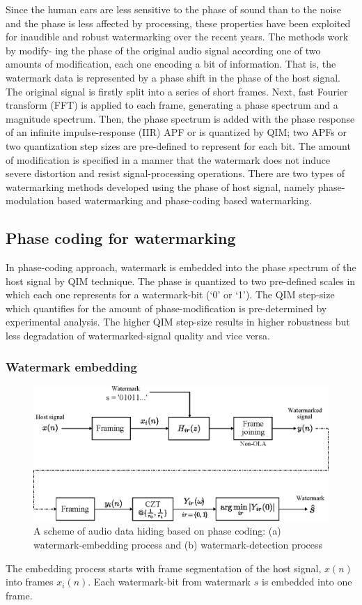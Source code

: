 Since the human ears are less sensitive to the phase of sound than to the noise and the
phase is less affected by processing, these properties have been exploited for inaudible and
robust watermarking over the recent years\cite{dong}. The methods work by modify-
ing the phase of the original audio signal according one of two amounts of modification,
each one encoding a bit of information. That is, the watermark data is represented by a
phase shift in the phase of the host signal.
The original signal is firstly split into a series of short frames. Next, fast Fourier
transform (FFT) is applied to each frame, generating a phase spectrum and a magnitude
spectrum. Then, the phase spectrum is added with the phase response of an infinite
impulse-response (IIR) APF or is quantized by QIM; two APFs or two quantization step
sizes are pre-defined to represent for each bit. The amount of modification is specified in a
manner that the watermark does not induce severe distortion and resist signal-processing
operations. There are two types of watermarking methods developed using the phase
of host signal, namely phase-modulation based watermarking and phase-coding based
watermarking.

\subsection{Phase coding for watermarking}
In phase-coding approach, watermark is embedded into the phase spectrum of the host
signal by QIM technique. The phase is quantized to two pre-defined scales in which each
one represents for a watermark-bit (‘0’ or ‘1’). The QIM step-size which quantifies for the
amount of phase-modification is pre-determined by experimental analysis. The higher
QIM step-size results in higher robustness but less degradation of watermarked-signal
quality and vice versa.

\subsubsection*{Watermark embedding}

\begin{figure}
  \includegraphics[width=1\textwidth]{PM_Scheme.eps}
  \caption{A scheme of audio data hiding based on phase coding: (a) watermark-embedding process and (b) watermark-detection process}
  \label{fig:pmscheme}
\end{figure}
The embedding process starts with frame segmentation of the host signal, \(x(n)\) into frames
\(x_i(n)\). Each watermark-bit from watermark \(s\) is embedded into one frame.

